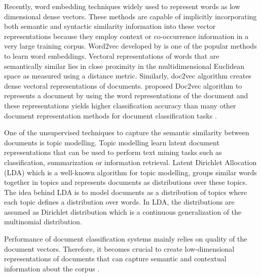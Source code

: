 \documentclass[a4paper,fleqn]{cas-dc}
\begin{document}
Recently, word embedding techniques widely used to represent words as low dimensional dense vectors. These methods are capable of implicitly incorporating both semantic and syntactic similarity information into these vector representations because they employ context or co-occurrence information in a very large training corpus.  Word2vec developed by  \cite{ref2} is one of the  popular methods to learn word embeddings. Vectoral representations of words that are semantically similar lies in close proximity in the multidimensional Euclidean space as measured using a distance metric.  Similarly, doc2vec algorithm creates dense vectoral representations of documents. \cite{ref3} proposed Doc2vec algorithm to represents a document by using the word representations of the document and these representations yields higher classification accuracy than many other document representation methods for document classification tasks \citep{ref4}.

One of the unsupervised techniques to capture the semantic similarity between documents is topic modelling. Topic modelling learn latent document representations that can be used to perform text mining tasks such as classification, summarization or information retrieval. Latent Dirichlet Allocation (LDA)  \citep{ref5} which is a well-known algorithm for topic modelling, groups similar words together in topics and represents documents as distributions over these topics. The idea behind LDA is to model documents as a distribution of topics where each topic defines a distribution over words. In LDA, the distributions are assumed as Dirichlet distribution which is a continuous generalization of the multinomial distribution.

Performance of document classification systems mainly relies on quality of the document vectors. Therefore, it becomes crucial to create low-dimensional representations of documents that can capture semantic and contextual information about the corpus \citep{ref6}.
\end{document}
